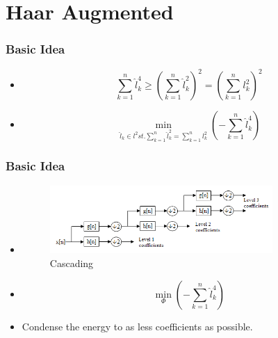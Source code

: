 \documentclass{beamer}
\begin{document}

\section{Haar Augmented}
\begin{frame}
    \frametitle{Basic Idea}
    \begin{itemize}
        \item \[
                  \sum_{k=1}^{n}\hat{l}_k^4
                  \geq
                  (\sum_{k=1}^{n}\hat{l}_k^2)^2
                  =
                  (\sum_{k=1}^{n}l_k^2)^2
              \]
        \item \[
                  \min_{\hat{l}_k\in l^2 st. \sum_{k=1}^{n}\hat{l}_k^2=\sum_{k=1}^{n}l_k^2}(-\sum_{k=1}^{n}\hat{l}_k^4)
              \]
    \end{itemize}
\end{frame}
\begin{frame}
    \frametitle{Basic Idea}
    \begin{itemize}
        \item 	\begin{figure}
                  \centering
                  \includegraphics[width=0.8\textwidth]{fig/Wavelets_-_Filter_Bank.png}
                  \caption{Cascading}
                  \label{fig:Cascading}
              \end{figure}
        \item \[
                  \min_{\Phi}(-\sum_{k=1}^{n}\hat{l}_k^4)
              \]
        \item Condense the energy to as less coefficients as possible.
    \end{itemize}
\end{frame}
\end{document}
